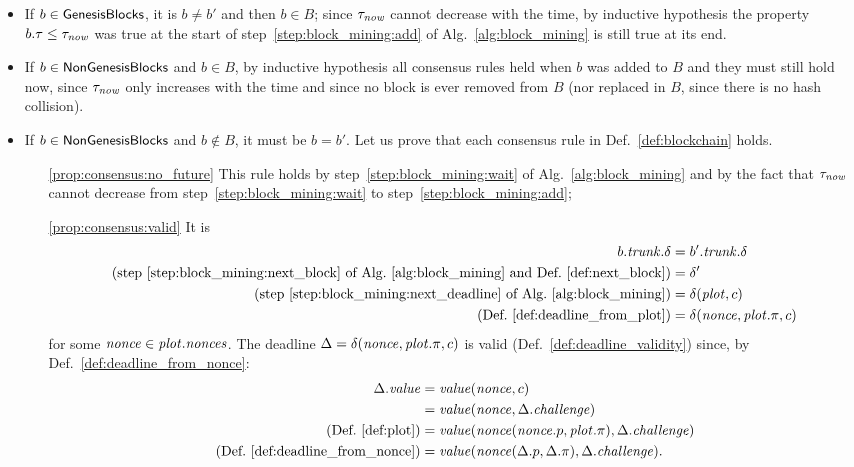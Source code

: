   \begin{itemize}
  \item If $b\in{\mathsf{GenesisBlocks}}$, it is $b\not=b'$ and then $b\in B$; since $\tau_{\mathit{now}}$
    cannot decrease with the time, by inductive hypothesis
    the property $b.\tau\le\tau_{\mathit{now}}$ was true at the start of
    step~\ref{step:block_mining:add} of Alg.~\ref{alg:block_mining}
    is still true at its end.
  \item If $b\in{\mathsf{NonGenesisBlocks}}$ and $b\in B$, by inductive hypothesis
    all consensus rules held when $b$ was added to
    $B$ and they must still hold now, since $\tau_{\mathit{now}}$ only
    increases with the time and since no block is ever removed from $B$
    (nor replaced in $B$, since there is no hash collision).
  \item If $b\in{\mathsf{NonGenesisBlocks}}$ and $b\not\in B$, it must be $b=b'$. Let us prove that each consensus rule
    in Def.~\ref{def:blockchain} holds.
    \begin{itemize}
    \item[\ref{prop:consensus:no_future}] This rule holds by step~\ref{step:block_mining:wait} of
      Alg.~\ref{alg:block_mining} and by the fact
      that $\tau_{\mathit{now}}$ cannot decrease from step~\ref{step:block_mining:wait} to
      step~\ref{step:block_mining:add};
    \item[\ref{prop:consensus:valid}] It is
      \begin{align*}
        b.{\mathit{trunk}}.\delta&=b'.{\mathit{trunk}}.\delta\\
        \text{(step~\ref{step:block_mining:next_block} of Alg.~\ref{alg:block_mining} and Def.~\ref{def:next_block})}&=\delta'\\
        \text{(step~\ref{step:block_mining:next_deadline} of Alg.~\ref{alg:block_mining})}&=
        \delta({\mathit{plot}},c)\\
        \text{(Def.~\ref{def:deadline_from_plot})}&=\delta({\mathit{nonce}},{\mathit{plot}}.\pi,c)
      \end{align*}
      for some ${\mathit{nonce}}\in{\mathit{plot}}.{\mathit{nonces}}$. The deadline $\Delta=\delta({\mathit{nonce}},{\mathit{plot}}.\pi,c)$ is valid
      (Def.~\ref{def:deadline_validity}) since, by Def.~\ref{def:deadline_from_nonce}:
      \begin{align*}
        \Delta.\mathit{value}&=\mathit{value}(\nonce,c)\\
        &=\mathit{value}(\nonce,\Delta.\challenge)\\
        \text{(Def.~\ref{def:plot})}&=\mathit{value}(\nonce(\nonce.p,\plot.\pi),\Delta.\challenge)\\
        \text{(Def.~\ref{def:deadline_from_nonce})}&=\mathit{value}(\nonce(\Delta.p,\Delta.\pi),\Delta.\challenge).

\end{align*}
\end{itemize}
\end{itemize}

